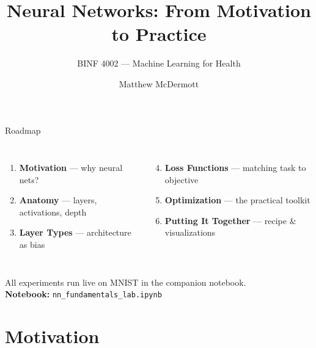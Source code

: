 \documentclass[aspectratio=169, 10pt]{beamer}
\title{Neural Networks: From Motivation to Practice}
\subtitle{BINF 4002 --- Machine Learning for Health}
\author{Matthew McDermott}
\institute{Department of Biomedical Informatics, Columbia University}
\date{}
\begin{document}

\maketitle

\begin{frame}{Roadmap}

\begin{columns}[T]
\begin{enumerate}
  \item \textbf{Motivation} --- why neural nets?
  \item \textbf{Anatomy} --- layers, activations, depth
  \item \textbf{Layer Types} --- architecture as bias
\end{enumerate}

\begin{enumerate}\setcounter{enumi}{3}
  \item \textbf{Loss Functions} --- matching task to objective
  \item \textbf{Optimization} --- the practical toolkit
  \item \textbf{Putting It Together} --- recipe \& visualizations
\end{enumerate}
\end{columns}

\vspace{12pt}
\begin{center}
\small All experiments run live on MNIST in the companion notebook.\\
\textcolor{AccentOrange}{} \textbf{Notebook:} \texttt{nn\_fundamentals\_lab.ipynb}
\end{center}

\end{frame}

\section{Motivation}
\end{document}
